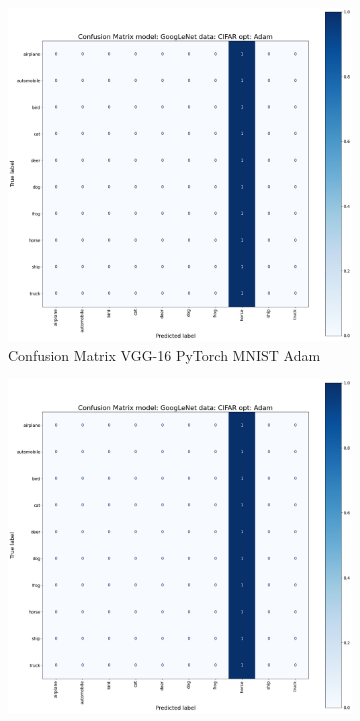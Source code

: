 \documentclass[conference]{IEEEtran}
\begin{document}
\begin{figure}[!htbp]
    \centering
    \begin{subfigure}[b]{0.22\textwidth}
        \centering
        \includegraphics[width=\textwidth]{img/matrix_sample.png}
        \caption{Confusion Matrix VGG-16 PyTorch MNIST Adam}
        \label{fig:x imatrix_GG-16_PyTorch_MNIST_Adam}
    \end{subfigure}
    \hfill
    \begin{subfigure}[b]{0.22\textwidth}
        \centering
        \includegraphics[width=\textwidth]{img/matrix_sample.png}

\end{subfigure}
\end{figure}
\end{document}
